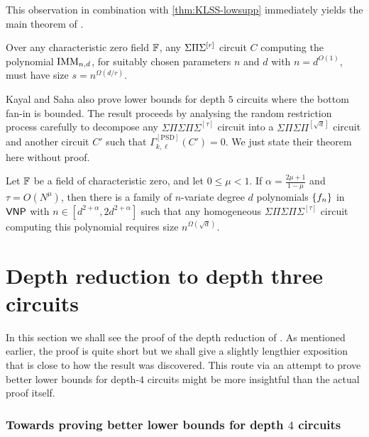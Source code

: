 This observation in combination with \autoref{thm:KLSS-lowsupp}
immediately yields the main theorem of \cite{KayalSaha14}. 

\begin{theorem}\label{thm:kaysaha-main}
  Over any characteristic zero field $\mathbb{F}$, any $\Sigma\Pi\Sigma^{[r]}$ circuit
  $C$ computing the polynomial $\mathrm{IMM}_{n,d}$, for suitably chosen
  parameters $n$ and $d$ with $n = d^{O(1)}$, must have size $s =
  n^{\Omega(d/r)}$. 
\end{theorem}

Kayal and Saha \cite{KayalSaha14} also prove lower bounds for depth $5$ circuits
where the bottom fan-in is bounded.
The result proceeds by analysing the random restriction process
carefully to decompose any $\Sigma\Pi\Sigma\Pi\Sigma^{[\tau]}$ circuit
into a $\Sigma\Pi\Sigma\Pi^{[\sqrt{d}]}$ circuit and another circuit
$C'$ such that $\Gamma_{k,\ell}^{[\mathrm{PSD}]}(C') = 0$.
We just state their theorem here without proof.

\begin{theorem}\label{thm:kaysaha-d5}
  Let $\mathbb{F}$ be a field of characteristic zero, and let $0\leq \mu < 1$.
  If $\alpha = \frac{2\mu + 1}{1 - \mu}$ and $\tau = O(N^\mu)$, then
  there is a family of $n$-variate degree $d$ polynomials
  $\left\{f_n\right\}$ in $\mathsf{VNP}$ with $n\in [d^{2+\alpha}, 2d^{2+\alpha}]$
  such that any homogeneous $\Sigma\Pi\Sigma\Pi\Sigma^{[\tau]}$
  circuit computing this polynomial requires size
  $n^{\Omega(\sqrt{d})}$.
\end{theorem}

\section{Depth reduction to depth three circuits}\label{sec:depth-3-red}

In this section we shall see the proof of the depth reduction of
\cite{gkks13b}.
As mentioned earlier, the proof is quite short but we shall give a
slightly lengthier exposition that is close to how the result was
discovered.
This route via an attempt to prove better lower bounds for depth-$4$
circuits might be more insightful than the actual proof itself. 

\subsubsection{Towards proving better lower bounds for depth $4$ circuits}

